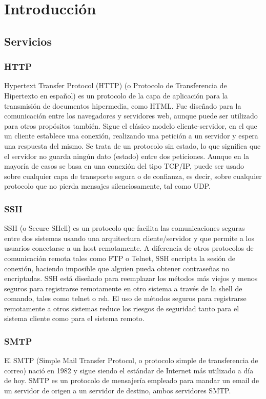 \chapter{Introducción}
\section{Servicios}

\subsection{HTTP}
\noindent
    Hypertext Transfer Protocol (HTTP) (o Protocolo de Transferencia de Hipertexto en español) es un protocolo de la capa de aplicación para la transmisión de documentos hipermedia, como HTML. Fue diseñado para la comunicación entre los navegadores y servidores web, aunque puede ser utilizado para otros propósitos también. Sigue el clásico modelo cliente-servidor, en el que un cliente establece una conexión, realizando una petición a un servidor y espera una respuesta del mismo. Se trata de un protocolo sin estado, lo que significa que el servidor no guarda ningún dato (estado) entre dos peticiones. Aunque en la mayoría de casos se basa en una conexión del tipo TCP/IP, puede ser usado sobre cualquier capa de transporte segura o de confianza, es decir, sobre cualquier protocolo que no pierda mensajes silenciosamente, tal como UDP.
    
\subsection{SSH}
\noindent
    SSH (o Secure SHell) es un protocolo que facilita las comunicaciones seguras entre dos sistemas usando una arquitectura cliente/servidor y que permite a los usuarios conectarse a un host remotamente. A diferencia de otros protocolos de comunicación remota tales como FTP o Telnet, SSH encripta la sesión de conexión, haciendo imposible que alguien pueda obtener contraseñas no encriptadas.
\noindent
    SSH está diseñado para reemplazar los métodos más viejos y menos seguros para registrarse remotamente en otro sistema a través de la shell de comando, tales como telnet o rsh. El uso de métodos seguros para registrarse remotamente a otros sistemas reduce los riesgos de seguridad tanto para el sistema cliente como para el sistema remoto.
    
\subsection{SMTP}
\noindent
El SMTP (Simple Mail Transfer Protocol, o protocolo simple de transferencia de correo) nació en 1982 y sigue siendo el estándar de Internet más utilizado a día de hoy. SMTP es un protocolo de mensajería empleado para mandar un email de un servidor de origen a un servidor de destino, ambos servidores SMTP. 

